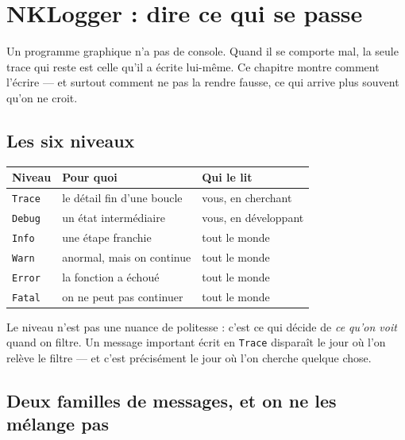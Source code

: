 \chapter{NKLogger : dire ce qui se passe}

Un programme graphique n'a pas de console. Quand il se comporte mal, la seule
trace qui reste est celle qu'il a écrite lui-même. Ce chapitre montre comment
l'écrire --- et surtout comment ne pas la rendre fausse, ce qui arrive plus
souvent qu'on ne croit.

\section{Les six niveaux}

\begin{center}
\begin{tabular}{@{}lll@{}}
\toprule
\textbf{Niveau} & \textbf{Pour quoi} & \textbf{Qui le lit} \\
\midrule
\texttt{Trace} & le détail fin d'une boucle & vous, en cherchant \\
\texttt{Debug} & un état intermédiaire & vous, en développant \\
\texttt{Info} & une étape franchie & tout le monde \\
\texttt{Warn} & anormal, mais on continue & tout le monde \\
\texttt{Error} & la fonction a échoué & tout le monde \\
\texttt{Fatal} & on ne peut pas continuer & tout le monde \\
\bottomrule
\end{tabular}
\end{center}

\begin{nkretenir}
Le niveau n'est pas une nuance de politesse : c'est ce qui décide de \emph{ce
qu'on voit} quand on filtre. Un message important écrit en \texttt{Trace}
disparaît le jour où l'on relève le filtre --- et c'est précisément le jour où
l'on cherche quelque chose.
\end{nkretenir}

\section{Deux familles de messages, et on ne les mélange pas}

